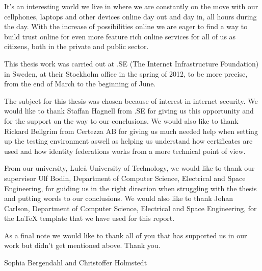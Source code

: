 It's an interesting world we live in where we are constantly on the move with our cellphones, laptops and other devices online day out and day in, all hours during the day.
With the increase of possibilities online we are eager to find a way to build trust online for even more feature rich online services for all of us as citizens, both in the private and public sector.

This thesis work was carried out at .SE (The Internet Infrastructure Foundation) in Sweden, at their Stockholm office in the spring of 2012, to be more precise, from the end of March to the beginning of June.

The subject for this thesis was chosen because of interest in internet security.
We would like to thank Staffan Hagnell from .SE for giving us this opportunity and for the support on the way to our conclusions.
We would also like to thank Rickard Bellgrim from Certezza AB for giving us much needed help when setting up the testing environment aswell as helping us understand how certificates are used and how identity federations works from a more technical point of view.

From our university, Lule\r{a} University of Technology, we would like to thank our supervisor Ulf Bodin, Department of Computer Science, Electrical and Space Engineering, for guiding us in the right direction when struggling with the thesis and putting words to our conclusions.
We would also like to thank Johan Carlson, Department of Computer Science, Electrical and Space Engineering, for the LaTeX template that we have used for this report. 

As a final note we would like to thank all of you that has supported us in our work but didn't get mentioned above.
Thank you.




%



\vspace*{2cm}%
\hfill Sophia Bergendahl and Christoffer Holmstedt
